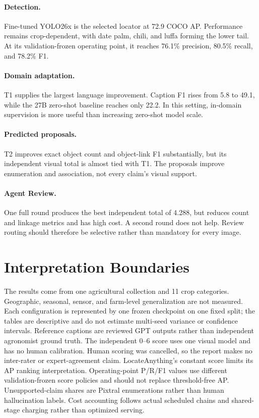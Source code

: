 \documentclass[11pt]{article}
\begin{document}
\paragraph{Detection.}
Fine-tuned YOLO26x is the selected locator at 72.9 COCO AP. Performance remains
crop-dependent, with date palm, chili, and luffa forming the lower tail. At its
validation-frozen operating point, it reaches 76.1\% precision, 80.5\% recall,
and 78.2\% F1.

\paragraph{Domain adaptation.}
T1 supplies the largest language improvement. Caption F1 rises from 5.8 to
49.1, while the 27B zero-shot baseline reaches only 22.2. In this setting,
in-domain supervision is more useful than increasing zero-shot model scale.

\paragraph{Predicted proposals.}
T2 improves exact object count and object-link F1 substantially, but its
independent visual total is almost tied with T1. The proposals improve
enumeration and association, not every claim's visual support.

\paragraph{Agent Review.}
One full round produces the best independent total of 4.288, but reduces count
and linkage metrics and has high cost. A second round does not help. Review
routing should therefore be selective rather than mandatory for every image.

\section{Interpretation Boundaries}

The results come from one agricultural collection and 11 crop categories.
Geographic, seasonal, sensor, and farm-level generalization are not measured.
Each configuration is represented by one frozen checkpoint on one fixed split;
the tables are descriptive and do not estimate multi-seed variance or confidence
intervals.
Reference captions are reviewed GPT outputs rather than independent agronomist
ground truth. The independent 0--6 score uses one visual model and has no human
calibration. Human scoring was cancelled, so the report makes no inter-rater or
expert-agreement claim. LocateAnything's constant score limits its AP ranking
interpretation. Operating-point P/R/F1 values use different validation-frozen
score policies and should not replace threshold-free AP. Unsupported-claim
shares are Pixtral enumerations rather than human hallucination labels. Cost
accounting follows actual scheduled chains and shared-stage charging rather
than optimized serving.
\end{document}
